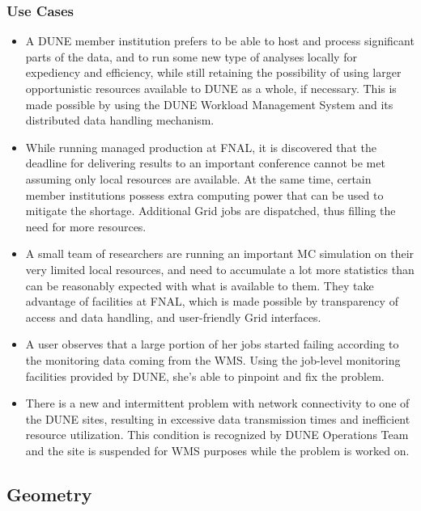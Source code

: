 \subsubsection{Use Cases}
\begin{itemize}
	\item  A DUNE member institution prefers to be able to host and process significant parts of the data,
	and to run some new type of analyses locally for expediency and efficiency, while still retaining the possibility
	of using larger opportunistic resources available to DUNE as a whole, if necessary. This is made possible by
	using the DUNE Workload Management System and its distributed data handling mechanism.
	
	\item  While running managed production at FNAL, it is discovered that the deadline for delivering results
	to an important conference cannot be met assuming only local resources are available. At the same time,
	certain member institutions possess extra computing power that can be used to mitigate the shortage.
	Additional Grid jobs are dispatched, thus filling the need for more resources.
	
	\item A small team of researchers are running an important MC simulation on their very limited local resources,
	and need to accumulate a lot more statistics than can be reasonably expected with what is available to them.
	They take advantage of facilities at FNAL, which is made possible by transparency of access and data handling,
	and user-friendly Grid interfaces.
	
	\item A user observes that a large portion of her jobs started failing according to the monitoring data coming from
	the WMS. Using the job-level monitoring facilities provided by DUNE, she's able to pinpoint and fix the problem.
	
	\item There is a new and intermittent problem with network connectivity to one of the DUNE sites, resulting in
	excessive data transmission times and inefficient resource utilization. This condition is recognized by DUNE
	Operations Team and the site is suspended for WMS purposes while the problem is worked on.
\end{itemize}

\newpage
\subsection{Geometry}

